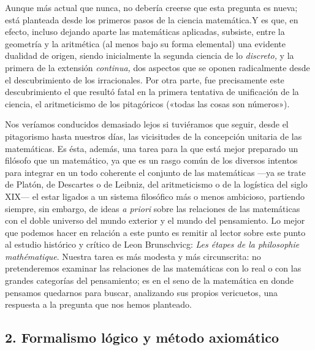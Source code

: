\documentclass[a4paper, 12pt, draft]{article}
\begin{document}
Aunque más actual que nunca, no debería creerse que esta pregunta es nueva; está planteada desde los primeros pasos de la ciencia matemática.\linebreak Y es que, en efecto, incluso dejando aparte las matemáticas aplicadas, subsiste, entre la geometría y la aritmética (al menos bajo su forma elemental) una evidente dualidad de origen, siendo inicialmente la segunda ciencia de lo \textit{discreto,} y la primera de la extensión \textit{continua,} dos aspectos que se oponen radicalmente desde el descubrimiento de los irracionales. Por otra parte, fue precisamente este descubrimiento el que resultó fatal en la primera tentativa de unificación de la ciencia, el aritmeticismo de los pitagóricos («todas las cosas son números»).

Nos veríamos conducidos demasiado lejos si tuviéramos que seguir, desde el pitagorismo hasta nuestros días, las vicisitudes de la concepción unitaria de las matemáticas. Es ésta, además, una tarea para la que está mejor preparado un filósofo que un matemático, ya que es un rasgo común de los diversos intentos para integrar en un todo coherente el conjunto de las matemáticas ---ya se trate de Platón, de Descartes o de Leibniz, del aritmeticismo o de la logística del siglo XIX--- el estar ligados a un sistema filosófico más o menos ambicioso, partiendo siempre, sin embargo, de ideas \textit{a priori} sobre las relaciones de las matemáticas con el doble universo del mundo exterior y el mundo del pensamiento. Lo mejor que podemos hacer en relación a este punto es remitir al lector sobre este punto al estudio histórico y crítico de Leon Brunschvicg: \textit{Les étapes de la philosophie mathématique}. Nuestra tarea es más modesta y más circunscrita: no pretenderemos examinar las relaciones de las matemáticas con lo real o con las grandes categorías del pensamiento; es en el seno de la matemática en donde pensamos quedarnos para buscar, analizando sus propios vericuetos, una respuesta a la pregunta que nos hemos planteado.



\subsection*{2. Formalismo lógico y método axiomático} 
\end{document}

